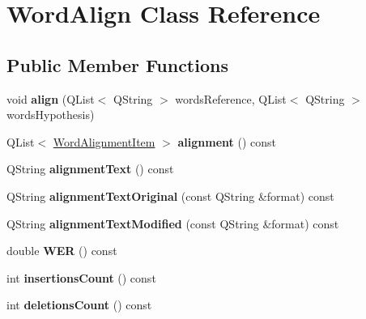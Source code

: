 \hypertarget{class_word_align}{}\section{Word\+Align Class Reference}
\label{class_word_align}
\subsection*{Public Member Functions}
\begin{DoxyCompactItemize}
\item 
\mbox{\label{class_word_align_ad31d17bc37b2a5edbdbcf157cddb8e2e}} 
void {\bfseries align} (Q\+List$<$ Q\+String $>$ words\+Reference, Q\+List$<$ Q\+String $>$ words\+Hypothesis)
\item 
\mbox{\label{class_word_align_a32b3ec2290520dc74a0042b6601fa80a}} 
Q\+List$<$ \hyperlink{struct_word_alignment_item}{Word\+Alignment\+Item} $>$ {\bfseries alignment} () const
\item 
\mbox{\label{class_word_align_ad9e6666ea6fa7eee4b18b7711c6c863b}} 
Q\+String {\bfseries alignment\+Text} () const
\item 
\mbox{\label{class_word_align_a794d847ac3cf16c16755835f46791c96}} 
Q\+String {\bfseries alignment\+Text\+Original} (const Q\+String \&format) const
\item 
\mbox{\label{class_word_align_a8dc1f5a1c7463de8e3ec1de3f55022a9}} 
Q\+String {\bfseries alignment\+Text\+Modified} (const Q\+String \&format) const
\item 
\mbox{\label{class_word_align_a31928305576a9260a4d4e957c4514258}} 
double {\bfseries W\+ER} () const
\item 
\mbox{\label{class_word_align_a899e21e8c505bbcbbd564e2ab674814f}} 
int {\bfseries insertions\+Count} () const
\item 
\mbox{\label{class_word_align_aa5b188687e5e58d3cbe4ed34d6f70568}} 
int {\bfseries deletions\+Count} () const
\item 
\mbox{\label{class_word_align_a5973ee294c045ace6593534fc231174a}} 

\end{DoxyCompactItemize}
